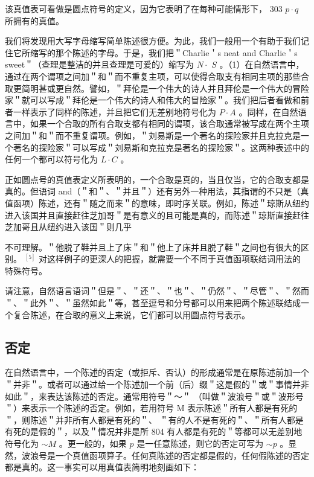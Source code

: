 该真值表可看做是圆点符号的定义，因为它表明了在每种可能情形下， 303 $p \cdot q$ 所拥有的真值。

我们将发现用大写字母缩写简单陈述很方便。为此，我们一般用一个有助于我们记住它所缩写的那个陈述的字母。于是，我们把＂Charlie＇s neat and Charlie＇s sweet＂（查理是整洁的并且查理是可爱的）缩写为 $N \cdot$ $S$ 。（1）在自然语言中，通过在两个谓项之间加＂和＂而不重复主项，可以使得合取支有相同主项的那些合取更简明甚或更自然。譬如，＂拜伦是一个伟大的诗人并且拜伦是一个伟大的冒险家＂就可以写成＂拜伦是一个伟大的诗人和伟大的冒险家＂。我们把后者看做和前者一样表示了同样的陈述，并且把它们无差别地符号化为 $P \cdot A$ 。同样，在自然语言中，如果一个合取的所有合取支都有相同的谓项，该合取通常被写成在两个主项之间加＂和＂而不重复谓项。例如，＂刘易斯是一个著名的探险家并且克拉克是一个著名的探险家＂可以写成＂刘易斯和克拉克是著名的探险家＂。这两种表述中的任何一个都可以符号化为 $L \cdot C$ 。

正如圆点号的真值表定义所表明的，一个合取是真的，当且仅当，它的合取支都是真的。但语词 and（＂和＂、＂并且＂）还有另外一种用法，其指谓的不只是（真值函项）陈述，还有＂随之而来＂的意味，即时序关联。例如，陈述＂琼斯从纽约进入该国并且直接赶往芝加哥＂是有意义的且可能是真的，而陈述＂琼斯直接赶往芝加哥且从纽约进入该国＂则几乎

不可理解。＂他脱了鞋并且上了床＂和＂他上了床并且脱了鞋＂之间也有很大的区别。 ${ }^{[5]}$ 对这样例子的更深人的把握，就需要一个不同于真值函项联结词用法的特殊符号。

请注意，自然语言语词＂但是＂、＂还＂、＂也＂、＂仍然＂、＂尽管＂、＂然而＂、＂此外＂、＂虽然如此＂等，甚至逗号和分号都可以用来把两个陈述联结成一个复合陈述，在合取的意义上来说，它们都可以用圆点符号表示。

\subsection{否定}
在自然语言中，一个陈述的否定（或拒斥、否认）的形成通常是在原陈述前加一个＂并非＂。或者可以通过给一个陈述加一个前（后）缀＂这是假的＂或＂事情并非如此＂，来表达该陈述的否定。通常用符号＂～＂ （叫做＂波浪号＂或＂波形号＂）来表示一个陈述的否定。例如，若用符号 M 表示陈述＂所有人都是有死的＂，则陈述＂并非所有人都是有死的＂、 ＂有的人不是有死的＂、＂所有人都是有死的是假的＂，以及＂情况并非是所 804 有人都是有死的＂等都可以无差别地符号化为 $\sim M$ 。更一般的，如果 $p$ 是一任意陈述，则它的否定可写为 $\sim p$ 。显然，波浪号是一个真值函项算子。任何真陈述的否定都是假的，任何假陈述的否定都是真的。这一事实可以用真值表简明地刻画如下：

